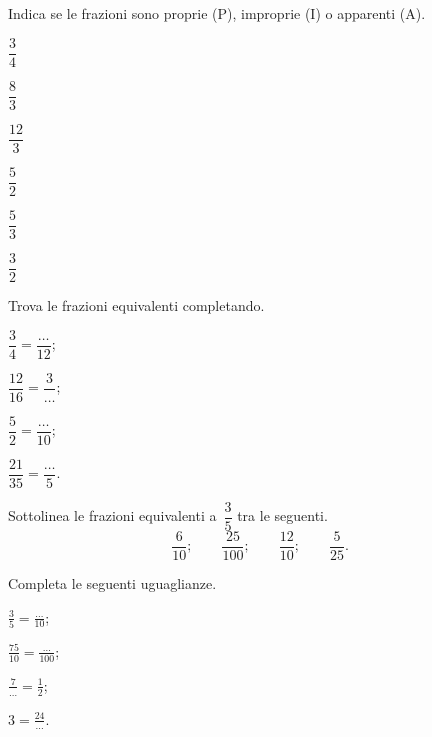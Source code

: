 \begin{esercizio}
\label{ese:3.5}
 Indica se le frazioni sono proprie (P), improprie (I) o apparenti (A).
 \begin{multicols}{3}
 \TabPositions{0.6cm}
 \begin{enumeratea}
 \item $\dfrac{3}{4}$ \tab\quad\boxP\quad\boxI\quad\boxA\vspace{1.1ex}
 \item $\dfrac{8}{3}$ \tab\quad\boxP\quad\boxI\quad\boxA
 \item $\dfrac{12}{3}$ \tab\quad\boxP\quad\boxI\quad\boxA\vspace{1.1ex}
 \item $\dfrac{5}{2}$ \tab\quad\boxP\quad\boxI\quad\boxA
 \item $\dfrac{5}{3}$ \tab\quad\boxP\quad\boxI\quad\boxA\vspace{1.1ex}
 \item $\dfrac{3}{2}$ \tab\quad\boxP\quad\boxI\quad\boxA
 \end{enumeratea}
 \end{multicols}
\end{esercizio}

\begin{esercizio}
\label{ese:3.6}
Trova le frazioni equivalenti completando.
 \begin{multicols}{4}
 \begin{enumeratea}
 	\item $\dfrac{3}{4}=\dfrac{\ldots}{12}$;
 	\item $\dfrac{12}{16}=\dfrac{3}{\ldots}$;
 	\item $\dfrac{5}{2}=\dfrac{\ldots}{10}$;
 	\item $\dfrac{21}{35}=\dfrac{\ldots}{5}$.
 \end{enumeratea}
 \end{multicols}
\end{esercizio}

\begin{esercizio}
\label{ese:3.7}
Sottolinea le frazioni equivalenti a~$\dfrac{3}{5}$ tra le seguenti.
\[\frac{6}{10};\qquad\frac{25}{100};\qquad\frac{12}{10};\qquad\frac{5}{25}.\]
\end{esercizio}

\begin{esercizio}
\label{ese:3.8}
Completa le seguenti uguaglianze.
\begin{multicols}{4}
\begin{enumeratea}
\item $\displaystyle{\frac{3}{5}=\frac{\ldots}{10}}$;
\item $\displaystyle{\frac{75}{10}=\frac{\ldots}{100}}$;
\item $\displaystyle{\frac{7}{\ldots}=\frac{1}{2}}$;
\item $\displaystyle{3=\frac{24}{\ldots}}$.
\end{enumeratea}
\end{multicols}
\end{esercizio}

